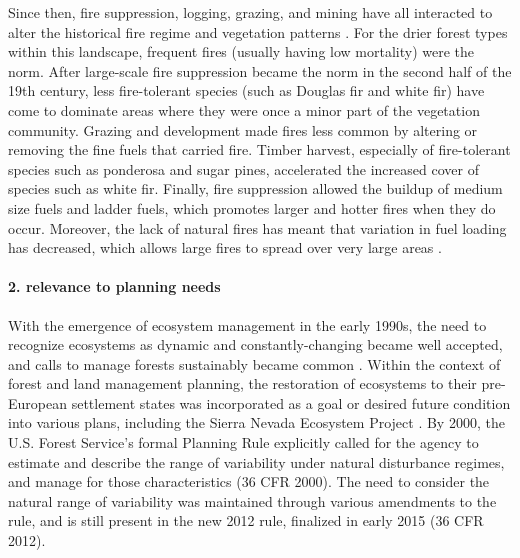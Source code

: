 \documentclass[12pt]{article}
\begin{document}
\begin{spacing}{1}
Since then, fire suppression, logging, grazing, and mining have all interacted to alter the historical fire regime and vegetation patterns \citep{Stephens2015,Knapp2013}. For the drier forest types within this landscape, frequent fires (usually having low mortality) were the norm. After large-scale fire suppression became the norm in the second half of the 19th century, less fire-tolerant species (such as Douglas fir and white fir) have come to dominate areas where they were once a minor part of the vegetation community. Grazing and development made fires less common by altering or removing the fine fuels that carried fire. Timber harvest, especially of fire-tolerant species such as ponderosa and sugar pines, accelerated the increased cover of species such as white fir. Finally, fire suppression allowed the buildup of medium size fuels and ladder fuels, which promotes larger and hotter fires when they do occur. Moreover, the lack of natural fires has meant that variation in fuel loading has decreased, which allows large fires to spread over very large areas \citep{Hessburg2005}.


\paragraph{2. relevance to planning needs}
With the emergence of ecosystem management in the early 1990s, the need to recognize ecosystems as dynamic and constantly-changing became well accepted, and calls to manage forests sustainably became common \citep{Christensen1996}. Within the context of forest and land management planning, the restoration of ecosystems to their pre-European settlement states was incorporated as a goal or desired future condition into various plans, including the Sierra Nevada Ecosystem Project \cite{SNEP1996a}. By 2000, the U.S. Forest Service's formal Planning Rule explicitly called for the agency to estimate and describe the range of variability under natural disturbance regimes, and manage for those characteristics (36 CFR  2000). The need to consider the natural range of variability was maintained through various amendments to the rule, and is still present in the new 2012 rule, finalized in early 2015 (36 CFR  2012).



\end{spacing}
\end{document}
